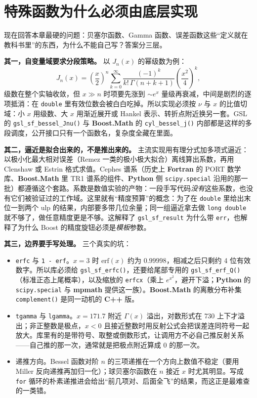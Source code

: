\documentclass[12pt,a4paper,fontset=fandol]{ctexbook}
\newcommand{\Fn}[1]{\texttt{#1()}}
\newcommand{\Tp}[1]{\texttt{#1}}
\newcommand{\Bk}{\allowbreak}
\newcommand{\Lib}[1]{\textbf{#1}}
\newcommand{\Lang}[1]{\textsf{\bfseries #1}}
\newcommand{\CPP}{\Lang{C++}}
\newcommand{\FTN}{\Lang{Fortran}}
\newcommand{\PY}{\Lang{Python}}
\begin{document}
\section{特殊函数为什么必须由底层实现}

现在回答本章最硬的问题：贝塞尔函数、Gamma 函数、误差函数这些``定义就在教科书里''的东西，为什么不能自己写？答案分三层。

\textbf{其一，自变量域要求分段策略。} 以 $J_n(x)$ 的幂级数为例：
\[
J_{n}(x)=\left(\frac{x}{2}\right)^{n}\sum_{k=0}^{\infty}
\frac{(-1)^{k}}{k!\,\Gamma(n+k+1)}\left(\frac{x^{2}}{4}\right)^{k},
\]
级数在整个实轴收敛，但 $x \gg n$ 时项要先涨到 $\sim e^{x}$ 量级再衰减，中间是剧烈的逐项抵消：在 \Tp{double} 里有效位数会被白白吃掉。所以实现必须按 $\nu$ 与 $x$ 的比值切域：小 $x$ 用级数、大 $x$ 用渐近展开或 Hankel 表示、转折点附近换另一套。GSL 的 \Fn{gsl\_sf\Bk\_bessel\Bk\_Jnu} 与 \Lib{Boost.Math} 的 \Fn{cyl\_bessel\_j} 内部都是这样的多段调度，公开接口只有一个函数名，复杂度全藏在里面。

\textbf{其二，逼近是拟合出来的，不是推出来的。} 主流实现用有理分式加多项式逼近：以极小化最大相对误差（Remez 一类的极小极大拟合）离线算出系数，再用 Clenshaw 或 Estrin 格式求值。Cephes 谱系（历史上 \FTN{} 的 PORT 数学库、\Lib{Boost.Math} 里 TR1 谱系的组件、\PY{} 侧 \Tp{scipy.special} 沿用的那一批）都遵循这个套路。系数是数值实验的产物：一段手写代码\emph{没有}这些系数，也没有它们被验证过的工作域。这里就有``精度预算''的概念：为了在 \Tp{double} 里给出末位一到两个 ulp 的结果，内部要多带几位余量；同一组逼近拿去做 \Tp{long double} 就不够了，做任意精度更是不够。这解释了 \Tp{gsl\_sf\Bk\_result} 为什么带 \Tp{err}，也解释了为什么 Boost 的精度旋钮必须是\emph{模板}参数。

\textbf{其三，边界要手写处理。} 三个真实的坑：
\begin{itemize}
\item \Tp{erfc} 与 \Tp{1 - erf}。$x=3$ 时 $\mathrm{erf}(x)$ 约为 $0.99998$，相减之后只剩约 4 位有效数字。所以库必须给 \Fn{gsl\_sf\Bk\_erfc}，还要给尾部专用的 \Fn{gsl\_sf\Bk\_erf\Bk\_Q}（标准正态上尾概率），以及缩放的 \Tp{erfcx}（乘上 $e^{x^{2}}$，避开下溢；\PY{} 的 \Tp{scipy.special} 与 \Lib{mpmath} 提供这一族）。\Lib{Boost.Math} 的离散分布补集 \Fn{complement} 是同一动机的 \CPP{} 版。
\item \Tp{tgamma} 与 \Tp{lgamma}。$x=171.7$ 附近 $\Gamma(x)$ 溢出，对数形式在 $730$ 上下才溢出；非正整数是极点，$x<0$ 且接近整数时用反射公式会把误差连同符号一起放大。库里有的是带符号、取整或倒数形式，让调用方不必自己推反射关系——自己推的那一次，通常就是把极点附近算成 $0$ 的那一次。
\item 递推方向。Bessel 函数对阶 $n$ 的三项递推在一个方向上数值不稳定（要用 Miller 反向递推再加归一化）；球贝塞尔函数在 $n$ 接近 $x$ 时尤其明显。写成 \Tp{for} 循环的朴素递推进会给出``前几项对、后面全飞''的结果，而这正是最难查的一类错。
\end{itemize}
\end{document}
